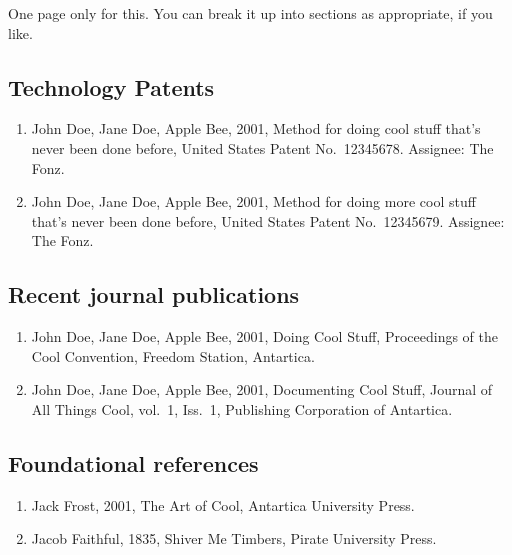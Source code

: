 \documentclass[12pt]{article}
\begin{document}
\setcounter{page}{10}  %

One page only for this. You can break it up into sections as appropriate, if you like. 

\subsection*{\bf Technology Patents}

\begin{enumerate}
\item John Doe, Jane Doe, Apple Bee, 2001,
Method for doing cool stuff that's never been done before, 
United States Patent No.~12345678. Assignee: The Fonz.

\item John Doe, Jane Doe, Apple Bee, 2001,
Method for doing more cool stuff that's never been done before, 
United States Patent No.~12345679. Assignee: The Fonz.


\end{enumerate}

\subsection*{\bf Recent journal publications}

\begin{enumerate}

\item John Doe, Jane Doe, Apple Bee, 2001,
Doing Cool Stuff, 
Proceedings of the Cool Convention, Freedom Station, Antartica.

\item John Doe, Jane Doe, Apple Bee, 2001,
Documenting Cool Stuff, 
Journal of All Things Cool, vol.~1, Iss.~1, Publishing Corporation of Antartica.



\end{enumerate}

\subsection*{\bf Foundational references}

\begin{enumerate}
\item Jack Frost, 2001,
The Art of Cool, Antartica University Press.

\item Jacob Faithful, 1835,
Shiver Me Timbers, Pirate University Press.

\end{enumerate}


 
\end{document}
